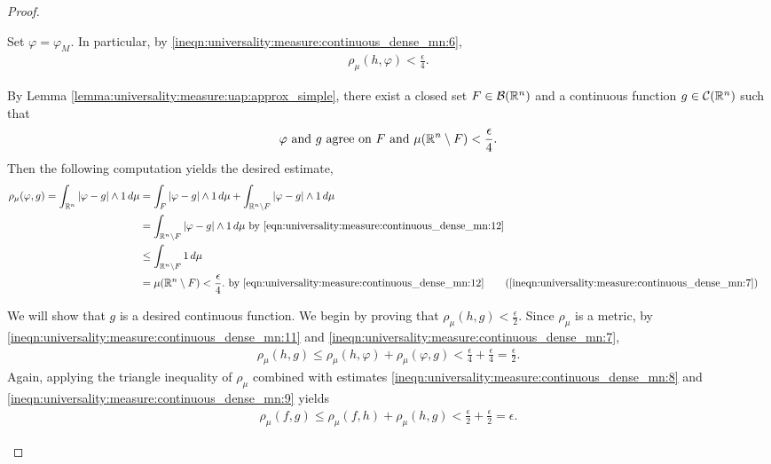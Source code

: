 \begin{proof}
\begin{step}
\end{step}
Set $\varphi = \varphi_M$. In particular, by \ref{ineqn:universality:measure:continuous_dense_mn:6}, 
\begin{align}
    \label{ineqn:universality:measure:continuous_dense_mn:11}
    \rho_\mu (h, \varphi) < \frac{\epsilon}{4}.
\end{align}
\begin{step}
By Lemma \ref{lemma:universality:measure:uap:approx_simple}, there exist a closed set $F \in {\mathcal B}({\mathbb R}^n)$ and a continuous function $g \in {\mathcal C}({\mathbb R}^n)$ such that \begin{align}
    \label{eqn:universality:measure:continuous_dense_mn:12}
    \varphi \text{ and } g \text{ agree on $F$} \text{ and } \mu ({\mathbb R}^n \setminus F) < \frac{\epsilon}{4}.
\end{align}
Then the following computation yields the desired estimate,
\begin{subequations}\label{ineqn:universality:measure:continuous_dense_mn:7}
\begin{align*}
    \rho_\mu(\varphi, g) = \int_{\R^n} | \varphi - g | \wedge 1 \, d\mu &= \int_{F} | \varphi - g | \wedge 1 \, d\mu +  \int_{\R^n \setminus F} | \varphi - g | \wedge 1 \, d\mu & \\
                                                 &= \int_{\R^n \setminus F} | \varphi - g | \wedge 1 \, d\mu \text{ by \ref{eqn:universality:measure:continuous_dense_mn:12}}\\
                                                 &\leq \int_{\R^n \setminus F}  1 \, d\mu  \\
                                                 &= \mu(\R^n \setminus F) < \frac{\epsilon}{4}. \text{ by \ref{eqn:universality:measure:continuous_dense_mn:12}}
     \tag{\ref{ineqn:universality:measure:continuous_dense_mn:7}} 
\end{align*}
\end{subequations}
\end{step}
\begin{step} We will show that $g$ is a desired continuous function.
We begin by proving that $\rho_\mu (h, g) < \frac{\epsilon}{2}$. Since $\rho_\mu$ is a metric, by \ref{ineqn:universality:measure:continuous_dense_mn:11} and \ref{ineqn:universality:measure:continuous_dense_mn:7}, \begin{align}
    \label{ineqn:universality:measure:continuous_dense_mn:9}
    \rho_\mu(h, g) \leq \rho_\mu(h, \varphi) + \rho_\mu(\varphi, g) < \frac{\epsilon}{4} + \frac{\epsilon}{4} = \frac{\epsilon}{2}.
\end{align}
Again, applying the triangle inequality of $\rho_\mu$ combined with estimates \ref{ineqn:universality:measure:continuous_dense_mn:8} and \ref{ineqn:universality:measure:continuous_dense_mn:9} yields 
\begin{align*}
    \rho_\mu (f, g) \leq \rho_\mu (f, h) + \rho_\mu (h, g) < \frac{\epsilon}{2} + \frac{\epsilon}{2} = \epsilon.    
\end{align*}
\end{step}
\end{proof}
